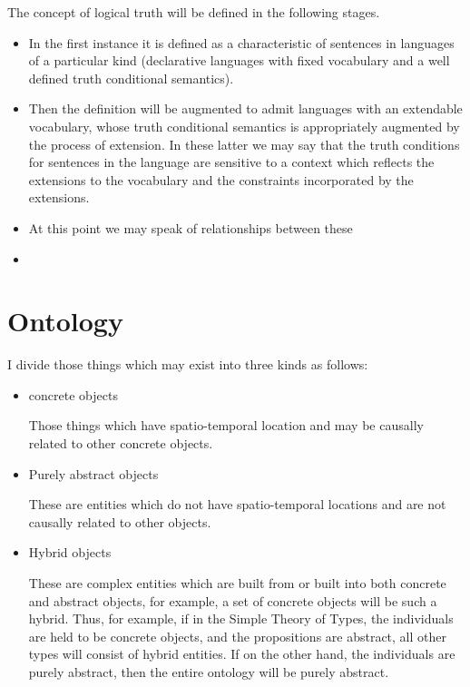 \documentclass[10pt,titlepage]{book}
\begin{document}
The concept of logical truth will be defined in the following stages.
\begin{itemize}
  \item
    In the first instance it is defined as a characteristic of sentences in languages of a particular kind (declarative languages with fixed vocabulary and a well defined truth conditional semantics).
  \item
Then the definition will be augmented to admit languages with an extendable vocabulary, whose truth conditional semantics is appropriately augmented by the process of extension.
In these latter we may say that the truth conditions for sentences in the language are sensitive to a context which reflects the extensions to the vocabulary and the constraints incorporated by the extensions.
\item
At this point we may speak of relationships between these 
\item

\end{itemize}


\section{Ontology}

I divide those things which may exist into three kinds as follows:

\begin{itemize}

\item concrete objects

  Those things which have spatio-temporal location and may be causally related to other concrete objects.

\item Purely abstract objects

  These are entities which do not have spatio-temporal locations and are not causally related to other objects.

\item Hybrid objects

  These are complex entities which are built from or built into both concrete and abstract objects, for example, a set of concrete objects will be such a hybrid.
  Thus, for example, if in the Simple Theory of Types, the individuals are held to be concrete objects, and the propositions are abstract, all other types will consist of hybrid entities.
  If on the other hand, the individuals are purely abstract, then the entire ontology will be purely abstract.
\end{itemize}
\end{document}
